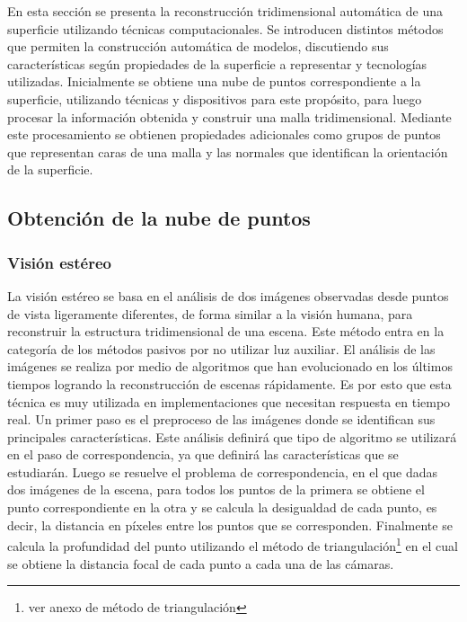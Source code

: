 En esta sección se presenta la reconstrucción tridimensional automática de una superficie utilizando técnicas computacionales.
Se introducen distintos métodos que permiten la construcción automática de modelos, discutiendo sus características según propiedades de la superficie a representar y tecnologías utilizadas. Inicialmente se obtiene una nube de puntos correspondiente a la superficie, utilizando técnicas y dispositivos para este propósito, para luego procesar la información obtenida y construir una malla tridimensional. Mediante este procesamiento se obtienen propiedades adicionales como grupos de puntos que representan caras de una malla y las normales que identifican la orientación de la superficie.

\subsection{Obtención de la nube de puntos}

\subsubsection{Visión estéreo}

La visión estéreo se basa en el análisis de dos imágenes observadas desde puntos de vista ligeramente diferentes, de forma similar a la visión humana, para reconstruir la estructura tridimensional de una escena. Este método entra en la categoría de los métodos pasivos por no utilizar luz auxiliar. El análisis de las imágenes se realiza por medio de algoritmos que han evolucionado en los últimos tiempos logrando la reconstrucción de escenas rápidamente. Es por esto que esta técnica es muy utilizada en implementaciones que necesitan respuesta en tiempo real.
Un primer paso es el preproceso de las imágenes donde se identifican sus principales características. Este análisis definirá que tipo de algoritmo se utilizará en el paso de correspondencia, ya que definirá las características que se estudiarán. Luego se resuelve el problema de correspondencia, en el que dadas dos imágenes de la escena, para todos los puntos de la primera se obtiene el punto correspondiente en la otra y se calcula la desigualdad de cada punto, es decir, la distancia en píxeles entre los puntos que se corresponden. Finalmente se calcula la profundidad del punto utilizando el método de triangulación\footnote{ver anexo de método de triangulación} en el cual se obtiene la distancia focal de cada punto a cada una de las cámaras\cite{StereoReview}.

